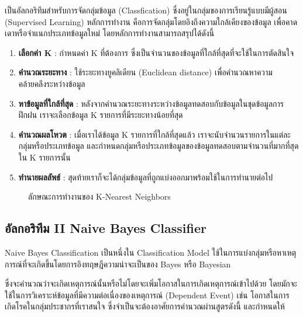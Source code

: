 เป็นอัลกอริทึมสำหรับการจัดกลุ่มข้อมูล (Classfication) ซึ่งอยู่ในกลุ่มของการเรียนรู้แบบมีผู้สอน (Supervised Learning)
หลักการทำงาน คือการจัดกลุ่มโดยอิงถึงความใกล้เคียงของข้อมูล เพื่อคาดเดาหรือจำแนกประเภทข้อมูลใหม่ โดยหลักการทำงานสามารถสรุปได้ดังนี้
\begin{enumerate}
    \item  \textbf{เลือกค่า K} : กำหนดค่า K ที่ต้องการ ซึ่งเป็นจำนวนของข้อมูลที่ใกล้ที่สุดที่จะใช้ในการตัดสินใจ
    \item  \textbf{คำนวณระยะทาง} : ใช้ระยะทางยูคลิเดียน (Euclidean distance) เพื่อคำนวณหาความคล้ายคลึงระหว่างข้อมูล
    \item  \textbf{หาข้อมูลที่ใกล้ที่สุด} : หลังจากคำนวณระยะทางระหว่างข้อมูลทดสอบกับข้อมูลในชุดข้อมูลการฝึกฝน เราจะเลือกข้อมูล K รายการที่มีระยะทางน้อยที่สุด
    \item  \textbf{คำนวณผลโหวต} : เมื่อเราได้ข้อมูล K รายการที่ใกล้ที่สุดแล้ว เราจะนับจำนวนรายการในแต่ละกลุ่มหรือประเภทข้อมูล 
    และกำหนดกลุ่มหรือประเภทข้อมูลของข้อมูลทดสอบตามจำนวนที่มากที่สุดใน K รายการนั้น
    \item  \textbf{ทำนายผลลัพธ์} : สุดท้ายเราก็จะได้กลุ่มข้อมูลที่ถูกแบ่งออกมาพร้อมใช้ในการทำนายต่อไป
\end{enumerate}

\begin{figure}[!h]\centering
    \setlength{\fboxrule}{0.2mm} %
    \setlength{\fboxsep}{1cm}
    \caption{ลักษณะการทำงานของ K-Nearest Neighbors}\label{fig:model2}
\end{figure}

\subsection{อัลกอริทึม II Naive Bayes Classifier}
Naive Bayes Classification เป็นหนึ่งใน Classification Model ใช้ในการแบ่งกลุ่มหรือหาเหตุการณ์ที่จะเกิดขึ้นโดยการอิงทฤษฎีความน่าจะเป็นของ 
Bayes หรือ Bayesian 
\par ซึ่งจะคำนวณว่าจะเกิดเหตุการณ์นั้นหรือไม่โดยจะเพิ่มโอกาสในการเกิดเหตุการณ์เข้าไปด้วย 
โดยมักจะใช้ในการวิเคราะห์ข้อมูลที่มีความต่อเนื่องของเหตุการณ์ (Dependent Event) เช่น 
โอกาสในการเกิดโรคในกลุ่มประชากรที่เราสนใจ ซึ่งจำเป็นจะต้องอาศัยการคำนวณผ่านสูตรดังนี้ และกำหนดให้

